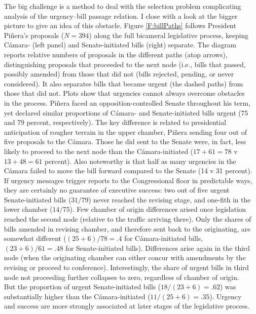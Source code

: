 \documentclass[letter,12pt]{article}
\begin{document}
The big challenge is a method to deal with the selection problem complicating analysis of the urgency--bill passage relation. I close with a look at the bigger picture to give an idea of this obstacle. Figure \ref{F:billPaths} follows President Pi\~nera's proposals ($N=394$) along the full bicameral legislative process, keeping C\'amara- (left panel) and Senate-initiated bills (right) separate. The diagram reports relative numbers of proposals in the different paths (atop arrows), distinguishing proposals that proceeded to the next node (i.e., bills that passed, possibly amended) from those that did not (bills rejected, pending, or never considered). It also separates bills that became urgent (the dashed paths) from those that did not. Plots show that urgencies cannot always overcome obstacles in the process. Pi\~nera faced an opposition-controlled Senate throughout his term, yet declared similar proportions of C\'amara- and Senate-initiated bills urgent (75 and 79 percent, respectively). The key difference is related to presidential anticipation of rougher terrain in the upper chamber, Pi\~nera sending four out of five proposals to the C\'amara. Those he did sent to the Senate were, in fact, less likely to proceed to the next node than the C\'amara-initiated ($17+61=78$ v\ $13+48=61$ percent). Also noteworthy is that half as many urgencies in the C\'amara failed to move the bill forward compared to the Senate  (14 v 31 percent). If urgency messages trigger reports to the Congressional floor in predictable ways, they are certainly no guarantee of executive success: two out of five urgent Senate-initiated bills ($31/79$) never reached the revising stage, and one-fith in the lower chamber ($14/75$). Few chamber of origin differences arised once legislation reached the second node (relative to the traffic arriving there). Only the shares of bills amended in revising chamber, and therefore sent back to the originating, are somewhat different ($(25+6)/78=.4$ for C\'amara-initiated bills, $(23+6)/61=.48$ for Senate-initiated bills). Differences arise again in the third node (when the originating chamber can either concur with amendments by the revising or proceed to conference). Interestingly, the share of urgent bills in third node not proceeding further collapses to zero, regardless of chamber of origin. But the proportion of urgent Senate-initiated bills ($18/(23+6)=.62$) was substantially higher than the C\'amara-initiated ($11/(25+6)=.35$). Urgency and success are more strongly associated at later stages of the legislative process. 
\end{document}
